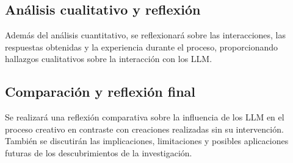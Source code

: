 \subsection{Análisis cualitativo y reflexión}
Además del análisis cuantitativo, se reflexionará sobre las interacciones, las respuestas obtenidas y la experiencia durante el proceso, proporcionando hallazgos cualitativos sobre la interacción con los LLM.

\subsection{Comparación y reflexión final}
Se realizará una reflexión comparativa sobre la influencia de los LLM en el proceso creativo en contraste con creaciones realizadas sin su intervención. También se discutirán las implicaciones, limitaciones y posibles aplicaciones futuras de los descubrimientos de la investigación.